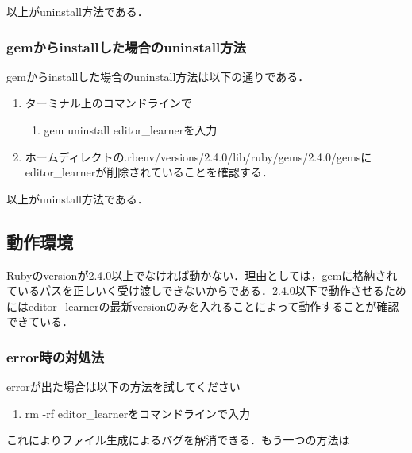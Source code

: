 \documentclass[11pt,dvipdfmx]{jsarticle}
\providecommand{\tightlist}{%
      \setlength{\itemsep}{0pt}\setlength{\parskip}{0pt}}
\begin{document}
以上がuninstall方法である．

\subsubsection{gemからinstallした場合のuninstall方法}\label{gemux304bux3089installux3057ux305fux5834ux5408ux306euninstallux65b9ux6cd5}

gemからinstallした場合のuninstall方法は以下の通りである．

\begin{enumerate}
\def\labelenumi{\arabic{enumi}.}
\tightlist
\item
  ターミナル上のコマンドラインで

  \begin{enumerate}
  \def\labelenumii{\arabic{enumii}.}
  \setcounter{enumii}{1}
  \tightlist
  \item
    gem uninstall editor\_learnerを入力
  \end{enumerate}
\item
  ホームディレクトの.rbenv/versions/2.4.0/lib/ruby/gems/2.4.0/gemsにeditor\_learnerが削除されていることを確認する．
\end{enumerate}

以上がuninstall方法である．

    \subsection{動作環境}\label{ux52d5ux4f5cux74b0ux5883}

    Rubyのversionが2.4.0以上でなければ動かない．理由としては，gemに格納されているパスを正しいく受け渡しできないからである．2.4.0以下で動作させるためにはeditor\_learnerの最新versionのみを入れることによって動作することが確認できている．

\subsubsection{error時の対処法}\label{errorux6642ux306eux5bfeux51e6ux6cd5}

errorが出た場合は以下の方法を試してください

\begin{enumerate}
\def\labelenumi{\arabic{enumi}.}
\tightlist
\item
  rm -rf editor\_learnerをコマンドラインで入力
\end{enumerate}

これによりファイル生成によるバグを解消できる．もう一つの方法は
\end{document}
